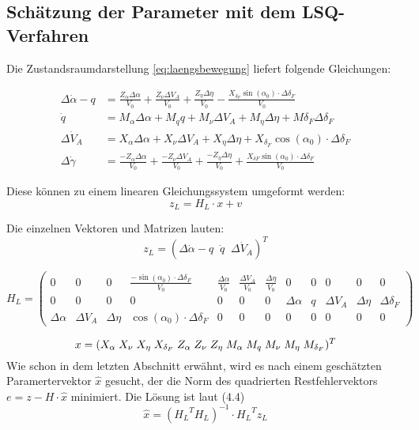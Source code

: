 \subsection{Schätzung der Parameter mit dem LSQ-Verfahren} 

Die Zustandsraumdarstellung \eqref{eq:laengsbewegung} liefert folgende Gleichungen: 

\begin{align}
	\Delta\dot \alpha-q &=  \frac{Z_{\alpha}\Delta\alpha}{V_0} + \frac{Z_{\nu}\Delta V_{A}}{V_0} + 
	\frac{Z_{\eta}\Delta\eta}{V_0} - \frac{X_{\delta_F}\sin{(\alpha_0)}\cdot\Delta\delta_F}{V_0}\\
	\dot q &= M_{\alpha}\Delta\alpha + M_q q + M_{\nu}\Delta V_A + M_{\eta}\Delta\eta + M{\delta_F}\Delta\delta_F\\
	\Delta\dot V_A &= X_{\alpha}\Delta\alpha +  X_{\nu}\Delta V_A + X_{\eta}\Delta\eta + 
	X_{\delta_F}\cos{(\alpha_0)}\cdot\Delta\delta_F \\
	\Delta \dot \gamma &= \frac{- Z_{\alpha}\Delta\alpha}{V_0} + \frac{- Z_{\nu}\Delta V_{A}}{V_0} + 
	\frac{-Z_{\eta}\Delta\eta}{V_0} + \frac{X_{\delta F}\sin{(\alpha_0)}\cdot\Delta\delta_F}{V_0}
\end{align}
	
Diese können zu einem linearen Gleichungssystem umgeformt werden: 
\begin{equation}
    z_{L}= H_{L}\cdot x + v
\end{equation}

Die einzelnen Vektoren und Matrizen lauten:
\setcounter{MaxMatrixCols}{15}
\begin{equation}
	z_{L} = (\Delta\dot \alpha-q \;\; \dot q \;\; \Delta\dot V_A)^T
\end{equation}

\begin{equation}
	 H_{L} = \begin{pmatrix}
		0&0&0& \frac{-\sin{(\alpha_0)}\cdot\Delta\delta_F}{V_0} & \frac{\Delta\alpha}{V_0}& \frac{\Delta V_A}{V_0} & 
		\frac{\Delta\eta}{V_0} &0&0&0&0&0   \\
		0&0&0&0&0&0&0 &\Delta\alpha & q & \Delta V_A & \Delta\eta & \Delta\delta_F \\
		\Delta\alpha &  \Delta V_A & \Delta\eta & \cos{(\alpha_0)}\cdot\Delta\delta_F &0&0&0&0&0&0&0&0 
	\end{pmatrix}
\end{equation}

\begin{equation}
	x = (X_{\alpha}\; 
	X_{\nu}\;
	X_{\eta}\;
	X_{\delta_F}\; 
	Z_{\alpha}\; 
	Z_{\nu}\;
	Z_{\eta}\;
	M_{\alpha}\;
	M_{q}\;
	M_{\nu}\;
	M_{\eta}\;
	M_{\delta_F})^T \\
\end{equation}  
Wie schon in dem letzten Abschnitt erwähnt, wird es nach einem geschätzten Paramertervektor $\hat{x}$ gesucht, der die Norm des quadrierten Restfehlervektors $ e = z - H\cdot \hat{x}$ minimiert. Die Lösung ist laut (4.4)
\begin{equation}
    \hat{x}= {({H_L}^{T} {H_L})}^{-1} \cdot {H_L}^{T} z_L 
\end{equation}

